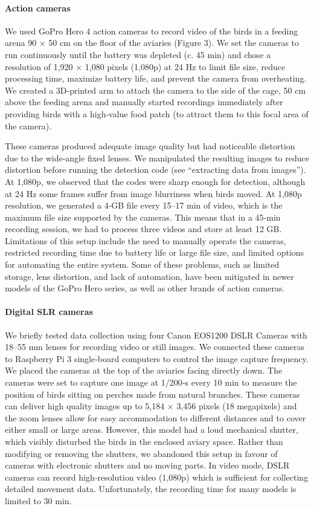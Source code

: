 \documentclass[11pt,a4paper,oneside]{article}
\begin{document}
\paragraph{Action cameras}
We used GoPro Hero 4 action cameras to record video of the birds in a feeding arena 90 × 50 cm on the floor of the aviaries (Figure 3). We set the cameras to run continuously until the battery was depleted (c. 45 min) and chose a resolution of 1,920 × 1,080 pixels (1,080p) at 24 Hz to limit file size, reduce processing time, maximize battery life, and prevent the camera from overheating. We created a 3D‐printed arm to attach the camera to the side of the cage, 50 cm above the feeding arena and manually started recordings immediately after providing birds with a high‐value food patch (to attract them to this focal area of the camera).

These cameras produced adequate image quality but had noticeable distortion due to the wide‐angle fixed lenses. We manipulated the resulting images to reduce distortion before running the detection code (see “extracting data from images”). At 1,080p, we observed that the codes were sharp enough for detection, although at 24 Hz some frames suffer from image blurriness when birds moved. At 1,080p resolution, we generated a 4‐GB file every 15–17 min of video, which is the maximum file size supported by the cameras. This means that in a 45‐min recording session, we had to process three videos and store at least 12 GB. Limitations of this setup include the need to manually operate the cameras, restricted recording time due to battery life or large file size, and limited options for automating the entire system. Some of these problems, such as limited storage, lens distortion, and lack of automation, have been mitigated in newer models of the GoPro Hero series, as well as other brands of action cameras.

\paragraph{Digital SLR cameras}
We briefly tested data collection using four Canon EOS1200 DSLR Cameras with 18–55 mm lenses for recording video or still images. We connected these cameras to Raspberry Pi 3 single‐board computers to control the image capture frequency. We placed the cameras at the top of the aviaries facing directly down. The cameras were set to capture one image at 1/200‐s every 10 min to measure the position of birds sitting on perches made from natural branches. These cameras can deliver high quality images up to 5,184 × 3,456 pixels (18 megapixels) and the zoom lenses allow for easy accommodation to different distances and to cover either small or large areas. However, this model had a loud mechanical shutter, which visibly disturbed the birds in the enclosed aviary space. Rather than modifying or removing the shutters, we abandoned this setup in favour of cameras with electronic shutters and no moving parts. In video mode, DSLR cameras can record high‐resolution video (1,080p) which is sufficient for collecting detailed movement data. Unfortunately, the recording time for many models is limited to 30 min.
\end{document}
